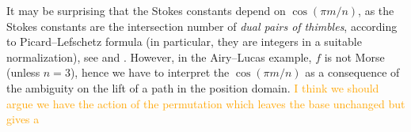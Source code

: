 \documentclass{article}
\newcommand{\laplace}{\mathcal{L}}
\theoremstyle{definition}
\theoremstyle{plain}
\begin{document}
{It may be surprising that the Stokes constants depend on $\cos(\pi m/n)$, as the Stokes constants are the intersection number of \textit{dual pairs of thimbles}, according to Picard--Lefschetz formula (in particular, they are integers in a suitable normalization), see \cite[Section 5]{pham} and \cite[Chapter ??]{Arnold}. However, in the Airy--Lucas example, $f$ is not Morse (unless $n=3$), hence we have to interpret the $\cos(\pi m/n)$ as a consequence of the ambiguity on the lift of a path in the position domain. \textcolor{orange}{ I think we should argue we have the action of the permutation which leaves the base unchanged but gives a } 








}
\end{document}
